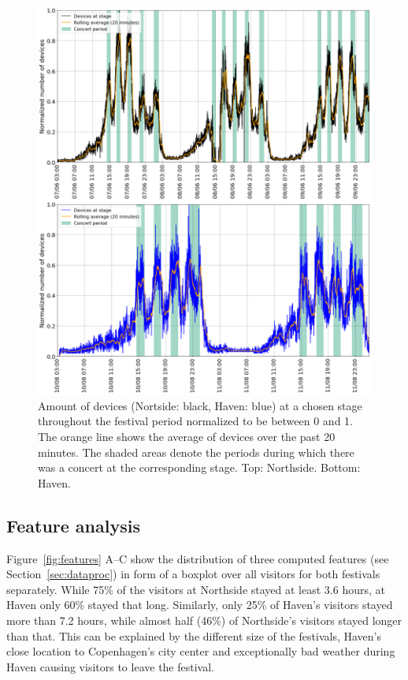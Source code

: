 \begin{figure}[tb]
  \centering
  \includegraphics[width=\linewidth]{figs/stage_timelines.png}
  \caption{Amount of devices (Nortside: black, Haven: blue) at a chosen stage throughout the festival period normalized to be between 0 and 1. The orange line shows the average of devices over the past 20 minutes. The shaded areas denote the periods during which there was a concert at the corresponding stage. Top: Northside. Bottom: Haven.}
  \label{fig:stage_timelines}
\end{figure}

\subsection{Feature analysis}
Figure~\ref{fig:features} A--C show the distribution of three computed features (see Section~\ref{sec:dataproc}) in form of a boxplot over all visitors for both festivals separately. While 75\% of the visitors at Northside stayed at least 3.6 hours, at Haven only 60\% stayed that long. Similarly, only 25\% of Haven's visitors stayed more than 7.2 hours, while almost half (46\%) of Northside's visitors stayed longer than that. This can be explained by the different size of the festivals, Haven's close location to Copenhagen's city center and exceptionally bad weather during Haven causing visitors to leave the festival.

